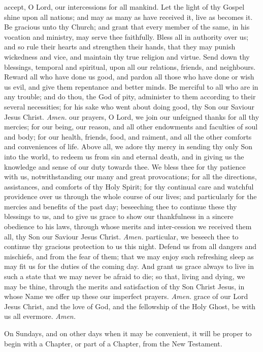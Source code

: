  accept, O Lord, our intercessions for all mankind. Let the light of thy Gospel shine upon all nations; and may as many as have received it, live as becomes it. Be gracious unto thy Church; and grant that every member of the same, in his vocation and ministry, may serve thee faithfully. Bless all in authority over us; and so rule their hearts and strengthen their hands, that they may punish wickedness and vice, and maintain thy true religion and virtue. Send down thy blessings, temporal and spiritual, upon all our relations, friends, and neighbours. Reward all who have done us good, and pardon all those who have done or wish us evil, and give them repentance and better minds. Be merciful to all who are in any trouble; and do thou, the God of pity, administer to them according to their several necessities; for his sake who went about doing good, thy Son our Saviour Jesus Christ. \textit{Amen.}
 our prayers, O Lord, we join our unfeigned thanks for all thy mercies; for our being, our reason, and all other endowments and faculties of soul and body; for our health, friends, food, and raiment, and all the other comforts and conveniences of life. Above all, we adore thy mercy in sending thy only Son into the world, to redeem us from sin and eternal death, and in giving us the knowledge and sense of our duty towards thee. We bless thee for thy patience with us, notwithstanding our many and great provocations; for all the directions, assistances, and comforts of thy Holy Spirit; for thy continual care and watchful providence over us through the whole course of our lives; and particularly for the mercies and benefits of the past day; beseeching thee to continue these thy blessings to us, and to give us grace to show our thankfulness in a sincere obedience to his laws, through whose merits and inter-cession we received them all, thy Son our Saviour Jesus Christ. \textit{Amen.}
 particular, we beseech thee to continue thy gracious protection to us this night. Defend us from all dangers and mischiefs, and from the fear of them; that we may enjoy such refreshing sleep as may fit us for the duties of the coming day. And grant us grace always to live in such a state that we may never be afraid to die; so that, living and dying, we may be thine, through the merits and satisfaction of thy Son Christ Jesus, in whose Name we offer up these our imperfect prayers. \textit{Amen.}
 grace of our Lord Jesus Christ, {} and the love of God, and the fellowship of the Holy Ghost, be with us all evermore. \textit{Amen.}
\begin{rubric}
    On Sundays, and on other days when it may be convenient, it will be proper to begin with a Chapter, or part of a Chapter, from the New Testament.
\end{rubric}
